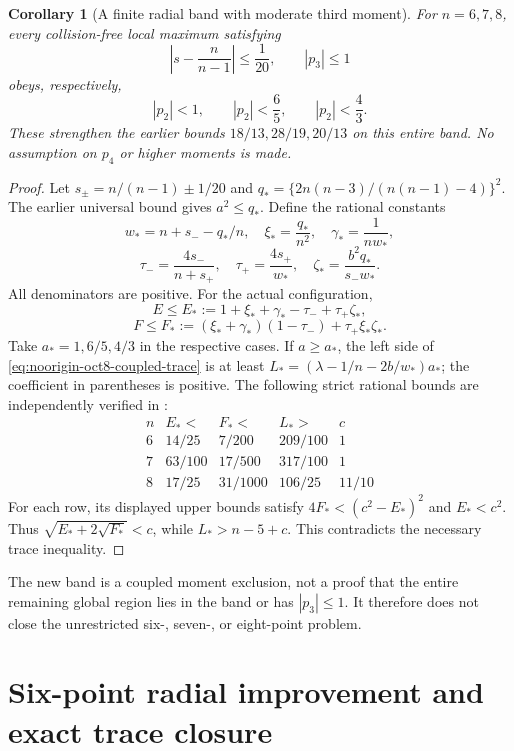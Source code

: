 \documentclass[11pt]{article}
\newtheorem{corollary}[theorem]{Corollary}
\theoremstyle{remark}
\numberwithin{equation}{section}
\begin{document}
\begin{corollary}[A finite radial band with moderate third moment]
\label{cor:noorigin-oct8-trace-band}
For $n=6,7,8$, every collision-free local maximum satisfying
\[
 \left|s-\frac{n}{n-1}\right|\le\frac1{20},
       \qquad |p_3|\le1
\]
obeys, respectively,
\[
              |p_2|<1,\qquad |p_2|<\frac65,\qquad
              |p_2|<\frac43 .
\]
These strengthen the earlier bounds $18/13,28/19,20/13$ on
this entire band. No assumption on $p_4$ or higher moments is made.
\end{corollary}
\begin{proof}
Let $s_\pm=n/(n-1)\pm1/20$ and
$q_*=\{2n(n-3)/(n(n-1)-4)\}^2$. The earlier universal bound gives
$a^2\le q_*$. Define the rational constants
\[
 w_*=n+s_- -q_*/n,\quad
 \xi_*=\frac{q_*}{n^2},\quad \gamma_*=\frac1{nw_*},
\]
\[
 \tau_-=\frac{4s_-}{n+s_+},\quad
 \tau_+=\frac{4s_+}{w_*},\quad
 \zeta_*=\frac{b^2q_*}{s_-w_*}.
\]
All denominators are positive. For the actual configuration,
\[
 E\le E_*:=1+\xi_*+\gamma_*-\tau_-+\tau_+\zeta_*,
\]
\[
 F\le F_*:=(\xi_*+\gamma_*)(1-\tau_-)
                                      +\tau_+\xi_*\zeta_* .
\]
Take $a_*=1,6/5,4/3$ in the respective cases. If $a\ge a_*$,
the left side of \eqref{eq:noorigin-oct8-coupled-trace} is at least
$L_*=(\lambda-1/n-2b/w_*)a_*$; the coefficient in parentheses
is positive. The following strict rational bounds are independently
verified in :
\[
\begin{array}{c|ccc|c}
 n&E_*<&F_*<&L_*>&c\\ \hline
 6&14/25&7/200&209/100&1\\
 7&63/100&17/500&317/100&1\\
 8&17/25&31/1000&106/25&11/10
\end{array}
\]
For each row, its displayed upper bounds satisfy
$4F_*<(c^2-E_*)^2$ and $E_*<c^2$. Thus
$\sqrt{E_*+2\sqrt{F_*}}<c$, while $L_*>n-5+c$.
This contradicts the necessary trace inequality.
\end{proof}

The new band is a coupled moment exclusion, not a proof that the
entire remaining global region lies in the band or has $|p_3|\le1$.
It therefore does not close the unrestricted six-, seven-, or
eight-point problem.

\section{Six-point radial improvement and exact trace closure}
\label{sec:noorigin-oct8-six}
\end{document}
